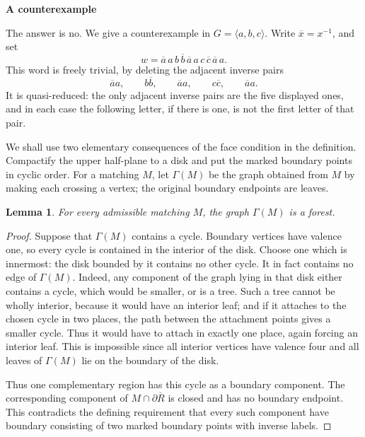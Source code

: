\documentclass[12pt]{article}
\newtheorem{lemma}{Lemma}
\newcommand{\ol}{\overline}
\begin{document}
\begin{center}
\textbf{A counterexample}
\end{center}

The answer is no.  We give a counterexample in
\(G=\langle a,b,c\rangle\).  Write \(\ol x=x^{-1}\), and set
\[
        w=\ol a\,a\, b\,\ol b\,\ol a\,a\, c\,\ol c\,\ol a\,a .
\]
This word is freely trivial, by deleting the adjacent inverse pairs
\[
        \ol a a,\qquad b\ol b,\qquad \ol a a,\qquad c\ol c,\qquad
        \ol a a .
\]
It is quasi-reduced: the only adjacent inverse pairs are the five
displayed ones, and in each case the following letter, if there is one,
is not the first letter of that pair.

We shall use two elementary consequences of the face condition in the
definition.  Compactify the upper half-plane to a disk and put the
marked boundary points in cyclic order.  For a matching \(M\), let
\(\Gamma(M)\) be the graph obtained from \(M\) by making each crossing a
vertex; the original boundary endpoints are leaves.

\begin{lemma}
For every admissible matching \(M\), the graph \(\Gamma(M)\) is a
forest.
\end{lemma}

\begin{proof}
Suppose that \(\Gamma(M)\) contains a cycle.  Boundary vertices have
valence one, so every cycle is contained in the interior of the disk.
Choose one which is innermost: the disk bounded by it contains no other
cycle.  It in fact contains no edge of \(\Gamma(M)\).  Indeed, any
component of the graph lying in that disk either contains a cycle, which
would be smaller, or is a tree.  Such a tree cannot be wholly interior,
because it would have an interior leaf; and if it attaches to the chosen
cycle in two places, the path between the attachment points gives a
smaller cycle.  Thus it would have to attach in exactly one place, again
forcing an interior leaf.  This is impossible since all interior vertices
have valence four and all leaves of \(\Gamma(M)\) lie on the boundary of
the disk.

Thus one complementary region has this cycle as a boundary component.
The corresponding component of
\(M\cap\partial\overline R\) is closed and has no boundary endpoint.
This contradicts the defining requirement that every such component
have boundary consisting of two marked boundary points with inverse
labels.
\end{proof}
\end{document}
